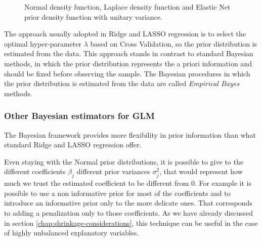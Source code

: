 \documentclass[a4paper, nobind]{templates/ociamthesis}
\theoremstyle{definition}
\theoremstyle{definition}
\theoremstyle{definition}
\theoremstyle{remark}
\begin{document}
\begin{figure}[!hbtp]

{\centering {}\newline{}

}

\caption[Normal density function, Laplace density function and Elastic Net prior density function with unitary variance.]{Normal density function, Laplace density function and Elastic Net prior density function with unitary variance.}\label{fig:normal-laplace}
\end{figure}

The approach usually adopted in Ridge and LASSO regression is to select the optimal hyper-parameter \(\lambda\) based on Cross Validation, so the prior distribution is estimated from the data. This approach stands in contrast to standard Bayesian methods, in which the prior distribution represents the a priori information and should be fixed before observing the sample. The Bayesian procedures in which the prior distribution is estimated from the data are called \emph{Empirical Bayes} methods.

\hypertarget{other-bayesian-estimators-for-glm}{%
\subsubsection{Other Bayesian estimators for GLM}\label{other-bayesian-estimators-for-glm}}

The Bayesian framework provides more flexibility in prior information than what standard Ridge and LASSO regression offer.

Even staying with the Normal prior distributions, it is possible to give to the different coefficients \(\beta_j\) different prior variances \(\sigma_j^2\), that would represent how much we trust the estimated coefficient to be different from \(0\). For example it is possible to use a non informative prior for most of the coefficients and to introduce an informative prior only to the more delicate ones. That corresponds to adding a penalization only to those coefficients. As we have already discussed in section \ref{chap:shrinkage-considerations}, this technique can be useful in the case of highly unbalanced explanatory variables.
\end{document}
